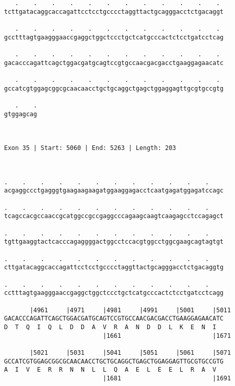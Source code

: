 \documentclass{article}
\begin{document}
\begin{Verbatim}
   .    .    .    .    .    .    .    .    .    .    .    . 
tcttgatacaggcaccagattcctcctgcccctaggttactgcagggacctctgacaggt
                                                            
   .    .    .    .    .    .    .    .    .    .    .    . 
gcctttagtgaagggaaccgaggctggctccctgctcatgcccactctcctgatcctcag
                                                            
   .    .    .    .    .    .    .    .    .    .    .    . 
gacacccagattcagctggacgatgcagtccgtgccaacgacgacctgaaggagaacatc
                                                            
   .    .    .    .    .    .    .    .    .    .    .    . 
gccatcgtggagcggcgcaacaacctgctgcaggctgagctggaggagttgcgtgccgtg
                                                            
   .    .
gtggagcag
         
         
 
Exon 35 | Start: 5060 | End: 5263 | Length: 203



.    .    .    .    .    .    .    .    .    .    .    .    
acgaggccctgagggtgaagaagaagatggaaggagacctcaatgagatggagatccagc
                                                            
.    .    .    .    .    .    .    .    .    .    .    .    
tcagccacgccaaccgcatggccgccgaggcccagaagcaagtcaagagcctccagagct
                                                            
.    .    .    .    .    .    .    .    .    .    .    .    
tgttgaaggtactcacccagaggggactggcctccacgtggcctggcgaagcagtagtgt
                                                            
.    .    .    .    .    .    .    .    .    .    .    .    
cttgatacaggcaccagattcctcctgcccctaggttactgcagggacctctgacaggtg
                                                            
.    .    .    .    .    .    .    .    .    .    .    .    
cctttagtgaagggaaccgaggctggctccctgctcatgcccactctcctgatcctcagg
                                                            
       |4961     |4971     |4981     |4991     |5001     |5011
GACACCCAGATTCAGCTGGACGATGCAGTCCGTGCCAACGACGACCTGAAGGAGAACATC
D  T  Q  I  Q  L  D  D  A  V  R  A  N  D  D  L  K  E  N  I  
                           |1661                         |1671
  
       |5021     |5031     |5041     |5051     |5061     |5071
GCCATCGTGGAGCGGCGCAACAACCTGCTGCAGGCTGAGCTGGAGGAGTTGCGTGCCGTG
A  I  V  E  R  R  N  N  L  L  Q  A  E  L  E  E  L  R  A  V  
                           |1681                         |1691
  

\end{Verbatim}
\end{document}
